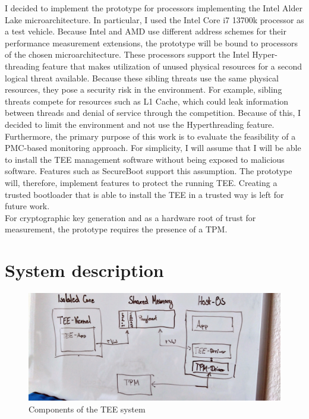 I decided to implement the prototype for processors implementing the Intel Alder
Lake microarchitecture. In particular, I used the Intel Core i7 13700k processor
as a test vehicle. Because Intel and AMD use different address schemes for their
performance measurement extensions, the prototype will be bound to processors of
the chosen microarchitecture. These processors support the Intel Hyper-threading
feature that makes utilization of unused physical resources for a second logical
threat available. Because these sibling threats use the same physical resources,
they pose a security risk in the environment. For example,  sibling threats
compete for resources such as L1 Cache, which could leak information
between threads and denial of service through the competition.
Because of this, I decided to limit the environment and not use the
Hyperthreading feature.\\

Furthermore, the primary purpose of this work is to evaluate the feasibility of
a PMC-based monitoring approach. For simplicity, I will assume that I will be
able to install the TEE management software without being exposed to malicious
software. Features such as SecureBoot support this assumption. The
prototype will, therefore, implement features to protect the running TEE.
Creating a trusted bootloader that is able to install the TEE in a trusted way
is left for future work.\\

For cryptographic key generation and as a hardware root of trust for
measurement, the prototype requires the presence of a TPM.


\section{System description}
\label{sec:30:system_description}

\begin{center}
    \begin{figure}
        \includegraphics[width=.8\textwidth]{images/architecture.JPG}
        \caption{Components of the TEE system}
        \label{fig:30:tee_system_design}
    \end{figure}
\end{center}

